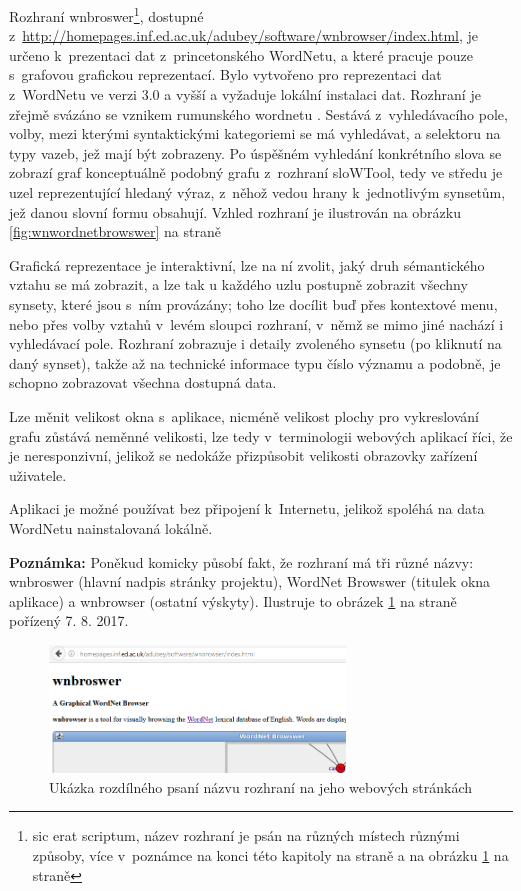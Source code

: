 \documentclass[a4paper, 11pt, oneside, showtrims]{book}
\begin{document}
					Rozhraní wnbroswer\footnote{sic erat scriptum, název rozhraní je psán na různých místech různými způsoby, více v~poznámce na konci této kapitoly na straně \pageref{note:wnbroswer} a na obrázku \ref{fig:wnbroswerbadwriting} na straně \pageref{fig:wnbroswerbadwriting}}, dostupné z~\url{http://homepages.inf.ed.ac.uk/adubey/software/wnbrowser/index.html}, je určeno k~prezentaci dat z~princetonského WordNetu, a které pracuje pouze s~grafovou grafickou reprezentací. Bylo vytvořeno pro reprezentaci dat z~WordNetu ve verzi 3.0 a vyšší a vyžaduje lokální instalaci dat. Rozhraní je zřejmě svázáno se vznikem rumunského wordnetu \parencite{fivser2011visualizing}. Sestává z~vyhledávacího pole, volby, mezi kterými syntaktickými kategoriemi se má vyhledávat, a selektoru na typy vazeb, jež mají být zobrazeny. Po úspěšném vyhledání konkrétního slova se zobrazí graf konceptuálně podobný grafu z~rozhraní sloWTool, tedy ve středu je uzel reprezentující hledaný výraz, z~něhož vedou hrany k~jednotlivým synsetům, jež danou slovní formu obsahují. Vzhled rozhraní je ilustrován na obrázku \ref{fig:wnwordnetbrowswer} na straně \pageref{fig:wnwordnetbrowswer}

					Grafická reprezentace je interaktivní, lze na ní zvolit, jaký druh sémantického vztahu se má zobrazit, a lze tak u každého uzlu postupně zobrazit všechny synsety, které jsou s~ním provázány; toho lze docílit buď přes kontextové menu, nebo přes volby vztahů v~levém sloupci rozhraní, v~němž se mimo jiné nachází i vyhledávací pole. Rozhraní zobrazuje i detaily zvoleného synsetu (po kliknutí na daný synset), takže až na technické informace typu číslo významu a podobně, je schopno zobrazovat všechna dostupná data.

					Lze měnit velikost okna s~aplikace, nicméně velikost plochy pro vykreslování grafu zůstává neměnné velikosti, lze tedy v~terminologii webových aplikací říci, že je neresponzivní, jelikož se nedokáže přizpůsobit velikosti obrazovky zařízení uživatele.

					Aplikaci je možné používat bez připojení k~Internetu, jelikož spoléhá na data WordNetu nainstalovaná lokálně. 

					\textbf{Poznámka:}\label{note:wnbroswer} Poněkud komicky působí fakt, že rozhraní má tři různé názvy: wnbroswer (hlavní nadpis stránky projektu), WordNet Browswer (titulek okna aplikace) a wnbrowser (ostatní výskyty). Ilustruje to obrázek \ref{fig:wnbroswerbadwriting} na straně \pageref{fig:wnbroswerbadwriting} pořízený 7. 8. 2017.

					\begin{figure}[h]
						\centering
						\includegraphics[width=0.7\textwidth]{wnbroswer.png}
						\caption{Ukázka rozdílného psaní názvu rozhraní na jeho webových stránkách}
						\label{fig:wnbroswerbadwriting}
					\end{figure}
\end{document}
